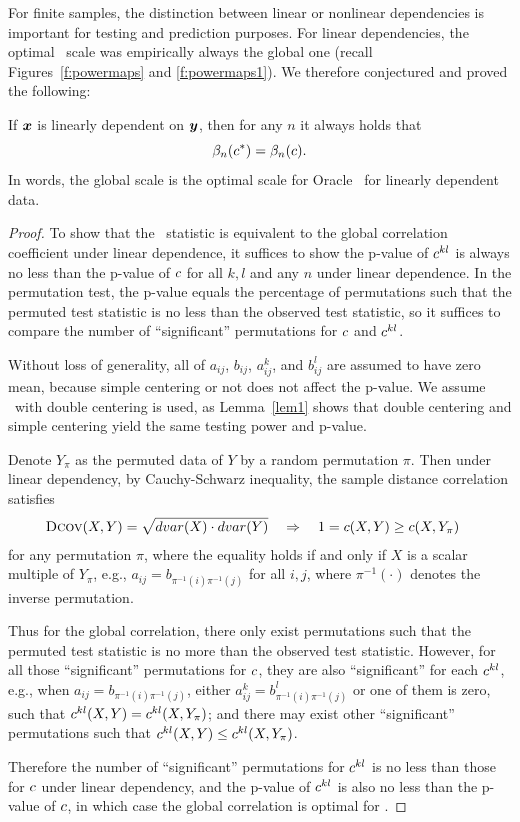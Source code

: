 \documentclass[11pt]{article}
\begin{document}
For finite samples, the distinction between linear or nonlinear dependencies is important for testing and prediction purposes.
For linear dependencies,  the optimal \Mgc~scale was empirically always the global one (recall Figures~\ref{f:powermaps} and \ref{f:powermaps1}). We therefore conjectured and proved the following:
\begin{thm}
\label{t:linear}
If $\boldsymbol{x}$ is linearly dependent on $\boldsymbol{y}$, then for any $n$ it always holds that
\begin{equation}
\beta_n(c^*) = \beta_n(c).
\end{equation}
In words, the global scale is the optimal scale for Oracle \Mgc~for linearly dependent data.
\end{thm}
\begin{proof}
To show that the \Mgc~statistic is equivalent to the global correlation coefficient under linear dependence, it suffices to show the p-value of $c^{kl}$ is always no less than the p-value of $c$ for all $k,l$ and any $n$ under linear dependence. In the permutation test, the p-value equals the percentage of permutations such that the permuted test statistic is no less than the observed test statistic, so it suffices to compare the number of ``significant'' permutations for $c$ and $c^{kl}$.

Without loss of generality, all of $a_{ij}$, $b_{ij}$, $a_{ij}^{k}$, and $b_{ij}^{l}$ are assumed to have zero mean, because simple centering or not does not affect the p-value. We assume \Dcorr~with double centering is used, as Lemma~\ref{lem1} shows that double centering and simple centering yield the same testing power and p-value.

Denote $Y_{\pi}$ as the permuted data of $Y$ by a random permutation $\pi$. Then under linear dependency, by Cauchy-Schwarz inequality, the  sample distance correlation satisfies
\begin{align*}
& {\normalfont\textsc{Dcov}}(X,Y) = \sqrt{dvar(X) \cdot dvar(Y)} \quad\Rightarrow\quad 1=c(X, Y) \geq c(X, Y_{\pi})
\end{align*}
for any permutation $\pi$, where the equality holds if and only if $X$ is a scalar multiple of $Y_{\pi}$, e.g., $a_{ij}=b_{\pi^{-1}(i) \pi^{-1}(j)}$ for all $i,j$, where $\pi^{-1}(\cdot)$ denotes the inverse permutation. 

Thus for the global correlation, there only exist permutations such that the permuted test statistic is no more than the observed test statistic. However, for all those ``significant'' permutations for $c$, they are also ``significant'' for each $c^{kl}$, e.g., when $a_{ij}=b_{\pi^{-1}(i) \pi^{-1}(j)}$, either $a_{ij}^{k}=b_{\pi^{-1}(i) \pi^{-1}(j)}^{l}$ or one of them is zero, such that $c^{kl}(X, Y)=c^{kl}(X, Y_{\pi})$; and there may exist other ``significant'' permutations such that $c^{kl}(X, Y) \leq c^{kl}(X, Y_{\pi})$.

Therefore the number of ``significant'' permutations for $c^{kl}$ is no less than those for $c$ under linear dependency, and the p-value of $c^{kl}$ is also no less than the p-value of $c$, in which case the global correlation is optimal for \Mgc. 
\end{proof}
\end{document}
